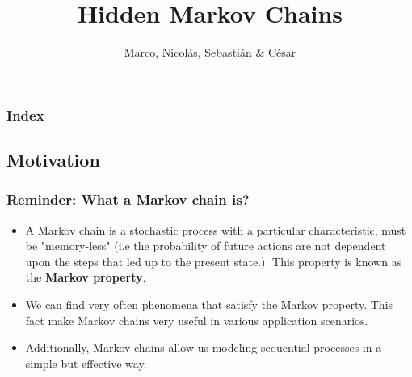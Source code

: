 \documentclass[xcolor=dvipsnames, compress]{beamer}
\title[Hidden Markov Chains]{Hidden Markov Chains}
\author{Marco, Nicolás, Sebastián \& César}
\institute[ITAM]
\begin{document}
%
\begin{frame}
\titlepage
\end{frame}

\begin{frame}
\frametitle{Index}
 \tableofcontents%
\end{frame}


\begin{frame}
\section{Motivation }
\frametitle{Reminder: What a Markov chain is?}
\begin{itemize}	
	\item A Markov chain is a stochastic process with a particular characteristic, must be "memory-less" (i.e the probability of future actions are not dependent upon the steps that led up to the present state.). This property is known as the \textbf{Markov property}.
	\item We can find very often phenomena that satisfy the Markov property. This fact make Markov chains very useful in various application scenarios.
	\item Additionally, Markov chains allow us modeling sequential processes in a simple but effective way.	
\end{itemize}
\end{frame}
\end{document}
